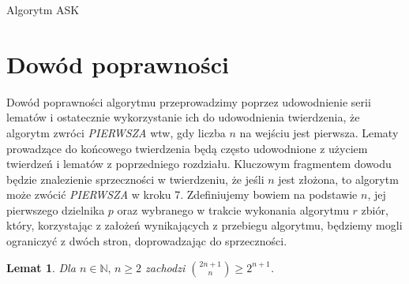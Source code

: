 \documentclass[declaration,shortabstract]{iithesis}
\theoremstyle{definition}
\theoremstyle{remark} \newtheorem{observation}{Obserwacja}
\theoremstyle{plain} \newtheorem{theorem}{Twierdzenie}
\theoremstyle{plain} \newtheorem{lemma}{Lemat}
\theoremstyle{remark} \newtheorem*{remark*}{Uwaga}
\theoremstyle{reminder} \newtheorem*{reminder*}{Przypomnienie}
\begin{document}
\begin{algorithm}
	\caption{Algorytm ASK}
	\begin{algorithmic}[1]
									    
		 
		\EndIf
		 
		 
		\EndIf
		   \EndIf
		 
		 
		\EndIf
		\EndFor
		 
	\end{algorithmic}
\end{algorithm}
	
\section{Dowód poprawności}
    
Dowód poprawności algorytmu przeprowadzimy poprzez udowodnienie serii lematów i ostatecznie wykorzystanie ich do udowodnienia twierdzenia, że algorytm zwróci \textit{PIERWSZA} wtw, gdy liczba $n$ na wejściu jest pierwsza. Lematy prowadzące do końcowego twierdzenia będą często udowodnione z użyciem twierdzeń i lematów z poprzedniego rozdziału. Kluczowym fragmentem dowodu będzie znalezienie sprzeczności w twierdzeniu, że jeśli $n$ jest złożona, to algorytm może zwócić \textit{PIERWSZA} w kroku 7. Zdefiniujemy bowiem na podstawie $n$, jej pierwszego dzielnika $p$ oraz wybranego w trakcie wykonania algorytmu $r$ zbiór, który, korzystając z założeń wynikających z przebiegu algorytmu, będziemy mogli ograniczyć z dwóch stron, doprowadzając do sprzeczności. 

\begin{lemma}\label{newton1}
	Dla $n \in \mathbb{N}, \, n \geq 2$ zachodzi ${2n + 1 \choose n} \geq 2^{n+1}$.
\end{lemma}
	
\end{document}
